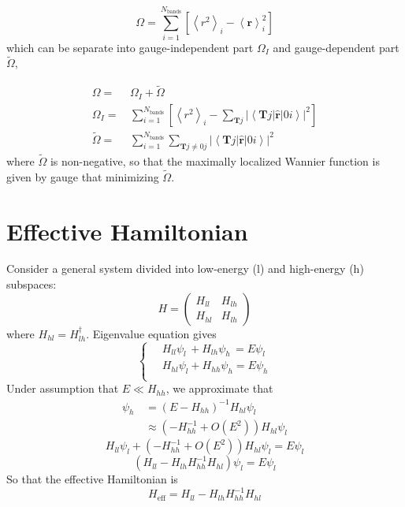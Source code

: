 \documentclass[12pt,a4paper]{article}
\begin{document}
    \[ \Omega = \sum_{i=1}^{N_{\text{bands}}}
    \left[\left\langle r^2\right\rangle _i
    - \left\langle \mathbf{r}\right\rangle _i^2 \right] \]
    which can be separate into gauge-independent part $\Omega_I$ and gauge-dependent part $\tilde{\Omega}$,

    \begin{align}
    \label{eq:Omega}
        \Omega = &\, \Omega_I + \tilde{\Omega} \\
    \label{eq:OmegaI}
        \Omega_I = &\, \sum_{i=1}^{N_{\text{bands}}}
    \left[\left\langle r^2\right\rangle _i
    - \sum_{\textbf{T}j} |\left\langle \textbf{T}j | \hat{\mathbf{r}} | 0i\right\rangle|^2 \right] \\
    \label{eq:Omegatilde}
        \tilde{\Omega} = &\, \sum_{i=1}^{N_{\text{bands}}} \sum_{\textbf{T}j\neq0j}
        |\left\langle \textbf{T}j | \hat{\mathbf{r}} | 0i\right\rangle|^2
    \end{align}
    where $\tilde{\Omega}$ is non-negative, so that the maximally localized Wannier function is given by gauge that minimizing $\tilde{\Omega}$.


\section{Effective Hamiltonian}

    Consider a general system divided into low-energy (l) and high-energy (h) subspaces:
    \begin{equation}
    \label{eq:H_lh}
        H = \begin{pmatrix}
            H_{ll} & H_{lh} \\ H_{hl} & H_{lh}
        \end{pmatrix}
    \end{equation}
    where $H_{hl} = H_{lh}^\dagger$. Eigenvalue equation gives
    \[\left\{\begin{aligned}
        &\, H_{ll} \psi_l \,+ H_{lh} \psi_h \,= E \psi_l \\
        &\, H_{hl} \psi_l + H_{hh} \psi_h = E \psi_h \\
    \end{aligned}\right.\]
    Under assumption that $E \ll H_{hh}$, we approximate that
    \[\begin{aligned}
        \psi_h
        &\, = \left(E - H_{hh}\right)^{-1} H_{hl} \psi_l \\
        &\, \approx \left(-H_{hh}^{-1} + O(E^2)\right) H_{hl} \psi_l
    \end{aligned}\]
    \[ H_{ll} \psi_l + \left(-H_{hh}^{-1} + O(E^2)\right) H_{hl} \psi_l = E \psi_l\]
    \[ \left(H_{ll} - H_{lh}H_{hh}^{-1}H_{hl}\right) \psi_l = E \psi_l \]
    So that the effective Hamiltonian is
    \begin{equation}
    \label{eq:Heff}
        H_{\mathrm{eff}} = H_{ll} - H_{lh}H_{hh}^{-1}H_{hl}
    \end{equation}
\end{document}
